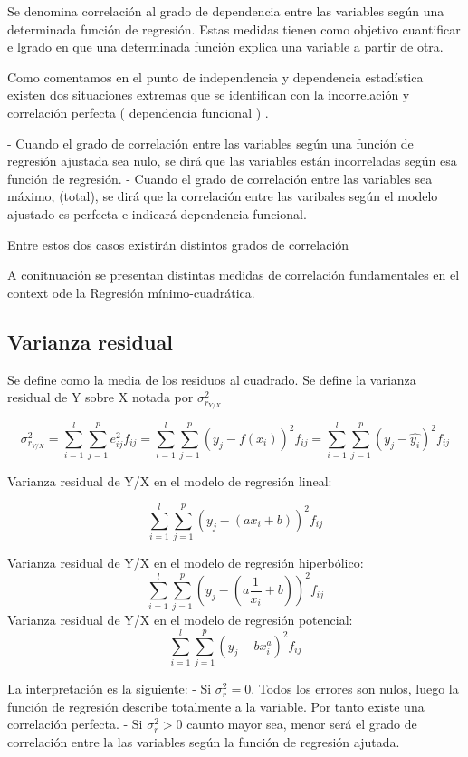 \documentclass{article}
\begin{document}
Se denomina correlación al grado de dependencia entre las variables según una determinada función de regresión. Estas medidas tienen como objetivo cuantificar e lgrado en que una determinada función explica una variable a partir de otra. 

Como comentamos en el punto de independencia y dependencia estadística existen dos situaciones extremas que se identifican con la incorrelación y correlación perfecta ( dependencia funcional ) .

- Cuando el grado de correlación entre las variables según una función de regresión ajustada sea nulo, se dirá que las variables están incorreladas según esa función de regresión.
- Cuando el grado de correlación entre las variables sea máximo, (total), se dirá que la correlación entre las varibales según el modelo ajustado es perfecta e indicará dependencia funcional.

Entre estos dos casos existirán distintos grados de correlación

A conitnuación se presentan distintas medidas de correlación fundamentales en el context ode la Regresión mínimo-cuadrática.

\subsection{Varianza residual}
Se define como la media de los residuos al cuadrado. Se define la varianza residual de Y sobre X notada por $\sigma_{r_{Y/X}}^2 $

$$ \sigma_{r_{Y/X}}^2 = \sum_{i=1}^l \sum_{j=1}^p e_{ij}^2 f_{ij} =  \sum_{i=1}^l \sum_{j=1}^p ( y_j - f(x_i))^2 f_{ij} = \sum_{i=1}^l \sum_{j=1}^p (y_j -\hat{y_i})^2 f_{ij} $$

Varianza residual de Y/X en el modelo de regresión lineal:

$$ \sum_{i=1}^l \sum_{j=1}^p ( y_j - (ax_i +b) )^2 f_{ij} $$

Varianza residual de Y/X en el modelo de regresión hiperbólico:
$$ \sum_{i=1}^l \sum_{j=1}^p ( y_j - (a\frac{1}{x_i} +b) )^2 f_{ij} $$
Varianza residual de Y/X en el modelo de regresión potencial:
$$\sum_{i=1}^l \sum_{j=1}^p ( y_j - bx_i^a )^2 f_{ij} $$

La interpretación es la siguiente: 
- Si $\sigma_r^2 = 0$. Todos los errores son nulos, luego la función de regresión describe totalmente a la variable. Por tanto existe una correlación perfecta.
- Si $\sigma_r^2 > 0$ caunto mayor sea, menor será el grado de correlación entre la las variables según la función de regresión ajutada.
\end{document}
